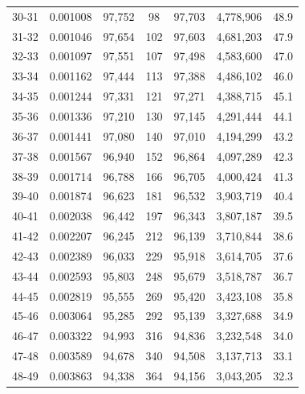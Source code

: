 \documentclass[12pt,a4paper]{article}
\begin{document}
\begin{longtable}{|c|c|c|c|c|c|c|}
30-31  & 0.001008      & 97,752       & 98            & 97,703        & 4,778,906    & 48.9         \\
31-32  & 0.001046      & 97,654       & 102           & 97,603        & 4,681,203    & 47.9         \\
32-33  & 0.001097      & 97,551       & 107           & 97,498        & 4,583,600    & 47.0         \\
33-34  & 0.001162      & 97,444       & 113           & 97,388        & 4,486,102    & 46.0         \\
34-35  & 0.001244      & 97,331       & 121           & 97,271        & 4,388,715    & 45.1         \\
35-36  & 0.001336      & 97,210       & 130           & 97,145        & 4,291,444    & 44.1         \\
36-37  & 0.001441      & 97,080       & 140           & 97,010        & 4,194,299    & 43.2         \\
37-38  & 0.001567      & 96,940       & 152           & 96,864        & 4,097,289    & 42.3         \\
38-39  & 0.001714      & 96,788       & 166           & 96,705        & 4,000,424    & 41.3         \\
39-40  & 0.001874      & 96,623       & 181           & 96,532        & 3,903,719    & 40.4         \\
40-41  & 0.002038      & 96,442       & 197           & 96,343        & 3,807,187    & 39.5         \\
41-42  & 0.002207      & 96,245       & 212           & 96,139        & 3,710,844    & 38.6         \\
42-43  & 0.002389      & 96,033       & 229           & 95,918        & 3,614,705    & 37.6         \\
43-44  & 0.002593      & 95,803       & 248           & 95,679        & 3,518,787    & 36.7         \\
44-45  & 0.002819      & 95,555       & 269           & 95,420        & 3,423,108    & 35.8         \\
45-46  & 0.003064      & 95,285       & 292           & 95,139        & 3,327,688    & 34.9         \\
46-47  & 0.003322      & 94,993       & 316           & 94,836        & 3,232,548    & 34.0         \\
47-48  & 0.003589      & 94,678       & 340           & 94,508        & 3,137,713    & 33.1         \\
48-49  & 0.003863      & 94,338       & 364           & 94,156        & 3,043,205    & 32.3         \\

\end{longtable}
\end{document}

